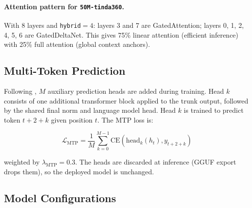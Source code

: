 \documentclass[11pt,a4paper]{article}
\begin{document}
\paragraph{Attention pattern for \texttt{50M-tinda360}.}
With 8 layers and \texttt{hybrid}$=4$: layers 3 and 7 are GatedAttention;
layers 0, 1, 2, 4, 5, 6 are GatedDeltaNet. This gives 75\% linear attention
(efficient inference) with 25\% full attention (global context anchors).

\subsection{Multi-Token Prediction}
\label{sec:mtp}

Following \citet{gloeckle2024better}, $M$ auxiliary prediction heads are added
during training. Head $k$ consists of one additional transformer block applied
to the trunk output, followed by the shared final norm and language model head.
Head $k$ is trained to predict token $t + 2 + k$ given position $t$. The MTP
loss is:

\begin{equation}
  \mathcal{L}_{\text{MTP}} = \frac{1}{M} \sum_{k=0}^{M-1}
    \mathrm{CE}(\text{head}_k(h_t), y_{t+2+k})
\end{equation}

weighted by $\lambda_{\text{MTP}} = 0.3$. The heads are discarded at inference
(GGUF export drops them), so the deployed model is unchanged.

\subsection{Model Configurations}
\end{document}
